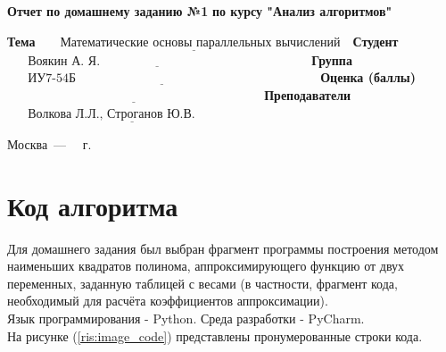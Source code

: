 \documentclass[12pt]{report}
\begin{document}
\begin{titlepage}
		
		\begin{center}
			\Large\textbf{Отчет по домашнему заданию №1}\newline
			\Large\textbf{по курсу "Анализ алгоритмов"}\newline
		\end{center}
	
		\noindent\textbf{Тема} $\underline{\text{~~~~~Математические основы параллельных вычислений~~}}$\newline\newline\newline
		\noindent\textbf{Студент} $\underline{\text{~~~~~Воякин А. Я.~~~~~~~~~~~~~~~~~~~~~~~~~~~~~~~~~~~~~~~~~~~~~~~~~~}}$\newline\newline
		\noindent\textbf{Группа} $\underline{\text{~~~~~ИУ7-54Б~~~~~~~~~~~~~~~~~~~~~~~~~~~~~~~~~~~~~~~~~~~~~~~~~~~~~~~~~~}}$\newline\newline
		\noindent\textbf{Оценка (баллы)} $\underline{\text{~~~~~~~~~~~~~~~~~~~~~~~~~~~~~~~~~~~~~~~~~~~~~~~~~~~~~~~~~~~~~}}$\newline\newline
		\noindent\textbf{Преподаватели} $\underline{\text{~~~~~Волкова Л.Л., Строганов Ю.В.~~~~~~~~~~~~~~~}}$\newline
		
		\begin{center}
			\vfill
			Москва~---~\the\year
			~г.
		\end{center}
	\restoregeometry
	\end{titlepage}
	
	\tableofcontents
	
	\newpage
	
	\chapter{Код алгоритма}
Для домашнего задания был выбран фрагмент программы построения методом наименьших квадратов полинома, аппроксимирующего функцию от двух переменных, заданную таблицей с весами (в частности, фрагмент кода, необходимый для расчёта коэффициентов аппроксимации).\\

Язык программирования - Python. Среда разработки - PyCharm.\\

На рисунке (\ref{ris:image_code}) представлены пронумерованные строки кода.
\end{document}
